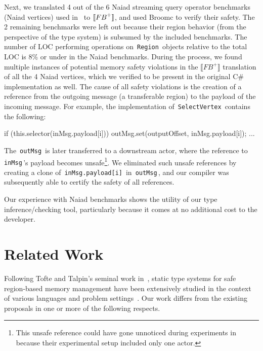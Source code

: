 \documentclass[a4paper,UKenglish]{lipics-v2018}
\newcommand{\C}[1]{\code{#1}}
\newcommand{\code}[1]{\,{\tt #1}\,}
\newcommand{\thesemof}[1]{ \llbracket #1 \rrbracket}
\newcommand{\absof}[1]{\thesemof{#1}}
\newcommand{\namec}{{\sc Broomc}\xspace}
\newcommand{\FB}{{\sc FB}\xspace}
\begin{document}
Next, we translated 4 out of the 6 Naiad streaming query operator
benchmarks (Naiad vertices) used in~\cite{Broom:HotOS} to
$\absof{\FB^+}$, and used \namec to verify their safety. The 2
remaining benchmarks were left out because their region behavior (from
the perspective of the type system) is subsumed by the included
benchmarks. The number of LOC performing operations on \C{Region}
objects relative to the total LOC is 8\% or under in the Naiad
benchmarks.  During the process, we found multiple instances of
potential memory safety violations in the $\absof{FB^+}$ translation
of all the 4 Naiad vertices, which we verified to be present in the
original C\# implementation as well. The cause of all safety
violations is the creation of a reference from the outgoing message (a
transferable region) to the payload of the incoming message. For
example, the implementation of \C{SelectVertex} contains the
following:
\begin{codejava}
  if (this.selector(inMsg.payload[i])) {
    outMsg.set(outputOffset, inMsg.payload[i]);
    ...
  } 
\end{codejava}
The \C{outMsg} is later transferred to a downstream actor, where the
reference to \C{inMsg}'s payload becomes unsafe\footnote{This unsafe
reference could have gone unnoticed during experiments
in~\cite{Broom:HotOS} because their experimental setup included only
one actor.}. We eliminated such unsafe references by creating a clone
of \C{inMsg.payload[i]} in \C{outMsg}, and our compiler was
subsequently able to certify the safety of all references. 

Our experience with Naiad benchmarks shows the utility of our type
inference/checking tool, particularly because it comes at no
additional cost to the developer.

\section{Related Work}
\label{sec:related-work}

Following Tofte and Talpin's seminal work
in~\cite{tofte93,tofte94,tofte97}, static type systems for safe
region-based memory management have been extensively studied in the
context of various languages and problem
settings~\cite{cyclone02,cyclone04,yates99,MIT03,DPJ09,HMN01,WW01,rust,gpu14}.
Our work differs from the existing proposals in one or more of the
following respects.
\end{document}
